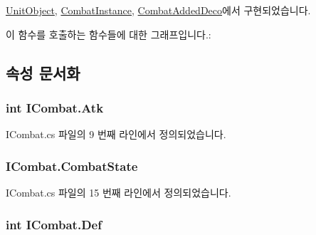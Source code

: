 \hyperlink{class_unit_object_a36511c5c48346ec7aba58e0150b3d462}{Unit\+Object}, \hyperlink{class_combat_instance_a612a867750ddfc0da7306e73752225b7}{Combat\+Instance}, \hyperlink{class_combat_added_deco_a3f1bc69d50b10571339d651eaa093a43}{Combat\+Added\+Deco}에서 구현되었습니다.



이 함수를 호출하는 함수들에 대한 그래프입니다.\+:




\subsection{속성 문서화}
\subsubsection[{\texorpdfstring{Atk}{Atk}}]{\setlength{\rightskip}{0pt plus 5cm}int I\+Combat.\+Atk\hspace{0.3cm}{\ttfamily [get]}}\hypertarget{interface_i_combat_a63d4002359409bac694aecdff0120c43}{}\label{interface_i_combat_a63d4002359409bac694aecdff0120c43}


I\+Combat.\+cs 파일의 9 번째 라인에서 정의되었습니다.

\subsubsection[{\texorpdfstring{Combat\+State}{CombatState}}]{ I\+Combat.\+Combat\+State\hspace{0.3cm}{\ttfamily [get]}}\hypertarget{interface_i_combat_aef944c90874b03051f60395f3c8532e4}{}\label{interface_i_combat_aef944c90874b03051f60395f3c8532e4}


I\+Combat.\+cs 파일의 15 번째 라인에서 정의되었습니다.

\subsubsection[{\texorpdfstring{Def}{Def}}]{\setlength{\rightskip}{0pt plus 5cm}int I\+Combat.\+Def\hspace{0.3cm}{\ttfamily [get]}}\hypertarget{interface_i_combat_a7d659a107f8e0f610cd74f1da0218e43}{}\label{interface_i_combat_a7d659a107f8e0f610cd74f1da0218e43}


